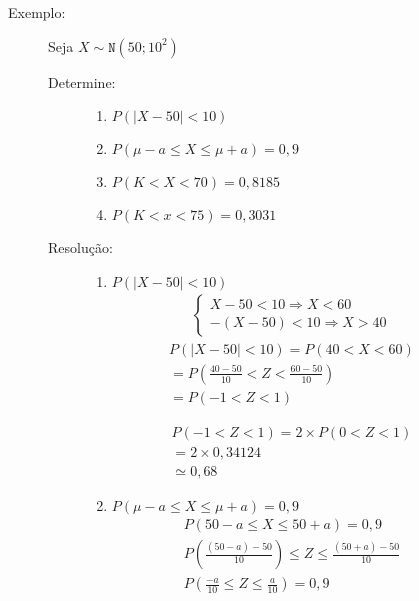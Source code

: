 \begin{description}
\begin{description}
\begin{enumerate}[label=(\alph*)]
      \end{enumerate}
    \item [Exemplo:] Seja $X \sim \mathtt{N}(50; 10^2)$
      \begin{description}
        \item [Determine:]
          \begin{enumerate}[label=(\alph*)]
   \item $P(|X-50| <10)$
  \item $P( \mu-a \leq X \leq \mu +a )=0,9$
  \item $P(K< X <70)=0,8185$
  \item $P(K < x <75)= 0,3031$
          \end{enumerate}
        \item [Resolução:]
\begin{enumerate}[label=(\alph*)]
   \item $P(|X-50| <10)$
     \begin{align*}
       \begin{cases}
        X-50<10 \Rightarrow X<60 \\
        -(X-50) <10 \Rightarrow X>40
       \end{cases}
     \end{align*}
     \begin{align*}
       P(|X-50| <10)  = P(40<X<60) \\
   = P(\frac{40-50}{10}< Z < \frac{60-50}{10}) \\
   = P(-1 < Z < 1)
 \end{align*} 
 \begin{figure}[H]
            \centering
            
            \label{fig:}
          \end{figure}
 \begin{figure}[H]
            \centering
            
            \label{fig:}
          \end{figure}

\begin{align*}
  P(-1 < Z <1)  = 2 \times P(0 < Z <1) \\
  = 2 \times 0,34124 \\
  \simeq 0,68
\end{align*}

  \item $P\left( \mu-a \leq X \leq \mu +a \right)=0,9$
\begin{align*}
  P\left(50- a \leq X \leq 50 +a\right)  = 0,9 \\
  P\left(\frac{(50-a)-50}{10}\right) \leq Z \leq \frac{(50+a)-50}{10} \\
  P\left(\frac{-a}{10} \leq Z \leq \frac{a}{10}\right)=0,9 
\end{align*}


\end{enumerate}
\end{description}
\end{description}
\end{description}
